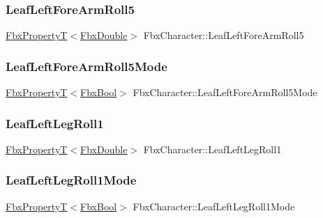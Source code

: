 \subsubsection{\texorpdfstring{Leaf\+Left\+Fore\+Arm\+Roll5}{LeafLeftForeArmRoll5}}
{\footnotesize\ttfamily \hyperlink{class_fbx_property_t}{Fbx\+PropertyT}$<$\hyperlink{fbxtypes_8h_a171e72a1c46fc15c1a6c9c31948c1c5b}{Fbx\+Double}$>$ Fbx\+Character\+::\+Leaf\+Left\+Fore\+Arm\+Roll5}

\mbox{\label{class_fbx_character_a56d039ed5967f3dc586655aeed17f7de}} 
\subsubsection{\texorpdfstring{Leaf\+Left\+Fore\+Arm\+Roll5\+Mode}{LeafLeftForeArmRoll5Mode}}
{\footnotesize\ttfamily \hyperlink{class_fbx_property_t}{Fbx\+PropertyT}$<$\hyperlink{fbxtypes_8h_a92e0562b2fe33e76a242f498b362262e}{Fbx\+Bool}$>$ Fbx\+Character\+::\+Leaf\+Left\+Fore\+Arm\+Roll5\+Mode}

\mbox{\label{class_fbx_character_abce416295080a2639984a3185fd941fb}} 
\subsubsection{\texorpdfstring{Leaf\+Left\+Leg\+Roll1}{LeafLeftLegRoll1}}
{\footnotesize\ttfamily \hyperlink{class_fbx_property_t}{Fbx\+PropertyT}$<$\hyperlink{fbxtypes_8h_a171e72a1c46fc15c1a6c9c31948c1c5b}{Fbx\+Double}$>$ Fbx\+Character\+::\+Leaf\+Left\+Leg\+Roll1}

\mbox{\label{class_fbx_character_a30ebf3e0212bc7339ec5a0131dbec5d5}} 
\subsubsection{\texorpdfstring{Leaf\+Left\+Leg\+Roll1\+Mode}{LeafLeftLegRoll1Mode}}
{\footnotesize\ttfamily \hyperlink{class_fbx_property_t}{Fbx\+PropertyT}$<$\hyperlink{fbxtypes_8h_a92e0562b2fe33e76a242f498b362262e}{Fbx\+Bool}$>$ Fbx\+Character\+::\+Leaf\+Left\+Leg\+Roll1\+Mode}

